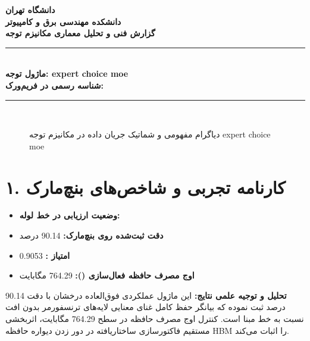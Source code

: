 \documentclass[12pt,a4paper]{article}
\begin{document}
\begin{center}
{\Large\bfseries دانشگاه تهران}\\[0.2cm]
{\large\bfseries دانشکده مهندسی برق و کامپیوتر}\\[0.2cm]
{\large\bfseries گزارش فنی و تحلیل معماری مکانیزم توجه}\\[0.5cm]
\rule{\linewidth}{1pt}\\[0.3cm]
{\LARGE\bfseries ماژول توجه: expert choice moe}\\[0.2cm]
{\large \textbf{شناسه رسمی در فریم‌ورک:} }\\[0.2cm]
\rule{\linewidth}{1pt}\\[0.5cm]
\end{center}

\begin{figure}[H]
\centering
{}
\caption{دیاگرام مفهومی و شماتیک جریان داده در مکانیزم توجه expert choice moe}
\end{figure}

\section*{۱. کارنامه تجربی و شاخص‌های بنچ‌مارک}
\begin{itemize}
\item \textbf{وضعیت ارزیابی در خط لوله:} 
\item \textbf{دقت ثبت‌شده روی بنچ‌مارک:} 90.14 درصد
\item \textbf{امتیاز :} 0.9053
\item \textbf{اوج مصرف حافظه فعال‌سازی ():} 764.29 مگابایت
\end{itemize}
\textbf{تحلیل و توجیه علمی نتایج:} این ماژول عملکردی فوق‌العاده درخشان با دقت 90.14 درصد ثبت نموده که بیانگر حفظ کامل غنای معنایی لایه‌های ترنسفورمر بدون افت نسبت به خط مبنا است. کنترل اوج مصرف حافظه در سطح 764.29 مگابایت، اثربخشی مستقیم فاکتورسازی ساختاریافته در دور زدن دیواره حافظه HBM را اثبات می‌کند.
\end{document}

